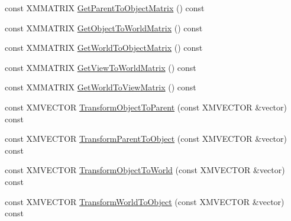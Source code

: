 \begin{DoxyCompactItemize}
\item 
const X\+M\+M\+A\+T\+R\+IX \hyperlink{classmage_1_1_transform_node_afb6c8dba9ae69e19bed4400477c00e42}{Get\+Parent\+To\+Object\+Matrix} () const
\item 
const X\+M\+M\+A\+T\+R\+IX \hyperlink{classmage_1_1_transform_node_aa380b495bdf5ac30abe63c542175a60e}{Get\+Object\+To\+World\+Matrix} () const
\item 
const X\+M\+M\+A\+T\+R\+IX \hyperlink{classmage_1_1_transform_node_a20bb6f313308bee29893be0685c884f9}{Get\+World\+To\+Object\+Matrix} () const
\item 
const X\+M\+M\+A\+T\+R\+IX \hyperlink{classmage_1_1_transform_node_af6b6c54f0115a3423d9f6955df236878}{Get\+View\+To\+World\+Matrix} () const
\item 
const X\+M\+M\+A\+T\+R\+IX \hyperlink{classmage_1_1_transform_node_a79572d99dea625ee4e05247c0f645ba9}{Get\+World\+To\+View\+Matrix} () const
\item 
const X\+M\+V\+E\+C\+T\+OR \hyperlink{classmage_1_1_transform_node_a4307cdcb0d013550777cd77ec963a5d9}{Transform\+Object\+To\+Parent} (const X\+M\+V\+E\+C\+T\+OR \&vector) const
\item 
const X\+M\+V\+E\+C\+T\+OR \hyperlink{classmage_1_1_transform_node_adba5732ccaf2edcbd293ba509eb2ec35}{Transform\+Parent\+To\+Object} (const X\+M\+V\+E\+C\+T\+OR \&vector) const
\item 
const X\+M\+V\+E\+C\+T\+OR \hyperlink{classmage_1_1_transform_node_af147669a4717d79c98c249522f1e9192}{Transform\+Object\+To\+World} (const X\+M\+V\+E\+C\+T\+OR \&vector) const
\item 
const X\+M\+V\+E\+C\+T\+OR \hyperlink{classmage_1_1_transform_node_af35f0b8ed64dd065b03356a029497285}{Transform\+World\+To\+Object} (const X\+M\+V\+E\+C\+T\+OR \&vector) const
\end{DoxyCompactItemize}
